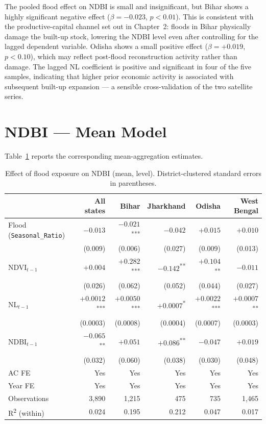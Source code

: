 \documentclass[12pt,a4paper,oneside]{report}
\begin{document}
The pooled flood effect on NDBI is small and insignificant, but Bihar shows a highly significant negative effect ($\beta = -0.023$, $p<0.01$). This is consistent with the productive-capital channel set out in Chapter~2: floods in Bihar physically damage the built-up stock, lowering the NDBI level even after controlling for the lagged dependent variable. Odisha shows a small positive effect ($\beta = +0.019$, $p<0.10$), which may reflect post-flood reconstruction activity rather than damage. The lagged NL coefficient is positive and significant in four of the five samples, indicating that higher prior economic activity is associated with subsequent built-up expansion --- a sensible cross-validation of the two satellite series.

\section{NDBI --- Mean Model}
Table~\ref{tab:ndbi-mean} reports the corresponding mean-aggregation estimates.

\begin{table}[h]
\centering
\caption{Effect of flood exposure on NDBI (mean, level). District-clustered standard errors in parentheses.}
\label{tab:ndbi-mean}
\begin{tabular}{lrrrrr}
\toprule
 & \textbf{All states} & \textbf{Bihar} & \textbf{Jharkhand} & \textbf{Odisha} & \textbf{West Bengal} \\
\midrule
Flood (\texttt{Seasonal\_Ratio}) & $-0.013$        & $-0.021$\textsuperscript{***} & $-0.042$ & $+0.015$ & $+0.010$ \\
                                  & (0.009)        & (0.006) & (0.027) & (0.009) & (0.013) \\
NDVI$_{t-1}$                      & $+0.004$        & $+0.282$\textsuperscript{***} & $-0.142$\textsuperscript{**} & $+0.104$\textsuperscript{**} & $-0.011$ \\
                                  & (0.026)        & (0.062) & (0.052) & (0.044) & (0.027) \\
NL$_{t-1}$                        & $+0.0012$\textsuperscript{***} & $+0.0050$\textsuperscript{***} & $+0.0007$\textsuperscript{*} & $+0.0022$\textsuperscript{***} & $+0.0007$\textsuperscript{**} \\
                                  & (0.0003)       & (0.0008) & (0.0004) & (0.0007) & (0.0003) \\
NDBI$_{t-1}$                      & $-0.065$\textsuperscript{**} & $+0.051$ & $+0.086$\textsuperscript{**} & $-0.047$ & $+0.019$ \\
                                  & (0.032)        & (0.060) & (0.038) & (0.030) & (0.048) \\
\midrule
AC FE      & Yes & Yes & Yes & Yes & Yes \\
Year FE    & Yes & Yes & Yes & Yes & Yes \\
Observations & 3{,}890 & 1{,}215 & 475 & 735 & 1{,}465 \\
R\textsuperscript{2} (within) & 0.024 & 0.195 & 0.212 & 0.047 & 0.017 \\
\bottomrule
\end{tabular}
\end{table}
\end{document}

